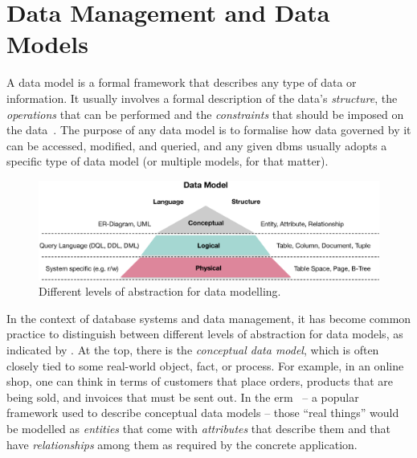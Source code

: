 \section{Data Management and Data Models}

\label{section:data_model}

A data model is a formal framework that describes any type of data or information. It usually involves a formal description of the data's \emph{structure}, the \emph{operations} that can be performed and the \emph{constraints} that should be imposed on the data~\cite{Garcia:2009Database}. The purpose of any data model is to formalise how data governed by it can be accessed, modified, and queried, and any given \acrshort{dbms} usually adopts a specific type of data model (or multiple models, for that matter).


\begin{figure}[b]
    \centering
    \includegraphics[width=\textwidth]{figures/datamodel_hierarchy.eps}
    \caption{Different levels of abstraction for data modelling.}
    \label{figure:datamodel_hierarchy}
\end{figure}

In the context of database systems and data management, it has become common practice to distinguish between different levels of abstraction for data models, as indicated by . At the top, there is the \emph{conceptual data model}, which is often closely tied to some real-world object, fact, or process. For example, in an online shop, one can think in terms of customers that place orders, products that are being sold, and invoices that must be sent out. In the \acrfull{erm}~\cite{Chen:1976The} -- a popular framework used to describe conceptual data models -- those ``real things'' would be modelled as \emph{entities} that come with \emph{attributes} that describe them and that have \emph{relationships} among them as required by the concrete application.

